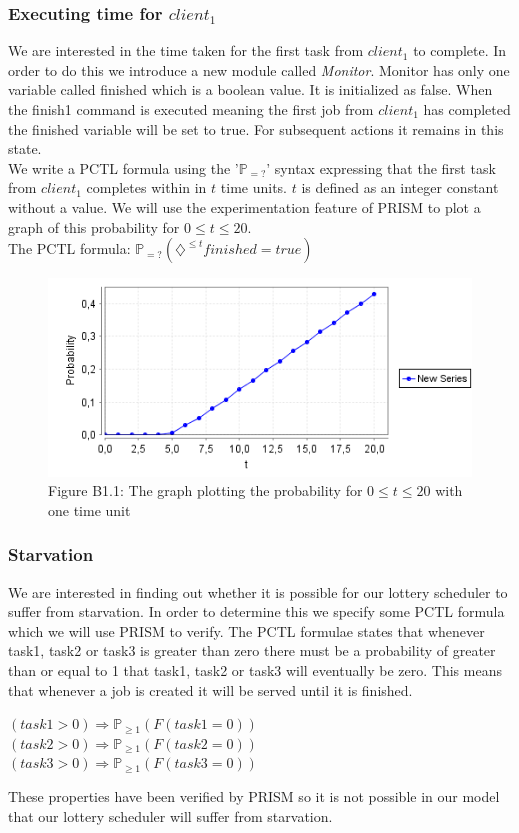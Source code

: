 \documentclass[12pt]{report}
\begin{document}
\subsubsection*{Executing time for $client_1$}
We are interested in the time taken for the first task from $client_1$ to complete. In order to do this we introduce a new module called \emph{Monitor}. Monitor has only one variable called finished which is a boolean value. It is initialized as false. When the finish1 command is executed meaning the first job from $client_1$ has completed the finished variable will be set to true. For subsequent actions it remains in this state.\\
We write a PCTL formula using the '$\mathbb{P}_{=?}$' syntax expressing that the first task from $client_1$ completes within in $t$ time units. $t$ is defined as an integer constant without a value. We will use the experimentation feature of PRISM to plot a graph of this probability for $0 \leq t \leq 20$.\\
The PCTL formula: $\mathbb{P}_{=?}(\diamondsuit^{\leq t} finished=true)$\\
\begin{figure}[H]
	\centering
	\includegraphics[scale=0.75]{../GFX/B1-1c.png}\\
	Figure B1.1: The graph plotting the probability for $0 \leq t \leq 20$ with one time unit
\end{figure}

\subsubsection*{Starvation}
We are interested in finding out whether it is possible for our lottery scheduler to suffer from starvation. In order to determine this we specify some PCTL formula which we will use PRISM to verify. The PCTL formulae states that whenever task1, task2 or task3 is greater than zero there must be a probability of greater than or equal to 1 that task1, task2 or task3 will eventually be zero. This means that whenever a job is created it will be served until it is finished.
\begin{center}
$(task1 > 0) \Rightarrow \mathbb{P}_{\geq 1}(F(task1 = 0))$\\
$(task2 > 0) \Rightarrow \mathbb{P}_{\geq 1}(F(task2 = 0))$\\
$(task3 > 0) \Rightarrow \mathbb{P}_{\geq 1} (F(task3 = 0))$
\end{center}
These properties have been verified by PRISM so it is not possible in our model that our lottery scheduler will suffer from starvation.
\end{document}
